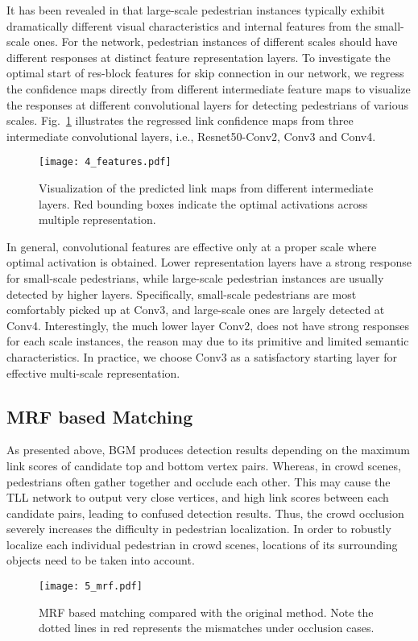 \documentclass[runningheads]{llncs}
\begin{document}
It has been revealed in \cite{SAFRCNN,ADM} that large-scale pedestrian instances typically exhibit dramatically different visual characteristics and internal features from the small-scale ones. For the network, pedestrian instances of different scales should have different responses at distinct feature representation layers. To investigate the optimal start of res-block features for skip connection in our network, we regress the confidence maps directly from different intermediate feature maps to visualize the responses at different convolutional layers for detecting pedestrians of various scales. Fig.~\ref{fig4} illustrates the regressed link confidence maps from three intermediate convolutional layers, i.e., Resnet50-Conv2, Conv3 and Conv4.
\begin{figure}[t]
	\centering
	\texttt{[image: 4\_features.pdf]}
	\caption{Visualization of the predicted link maps from different intermediate layers. Red bounding boxes indicate the optimal activations across multiple representation.}
	\label{fig4}
\end{figure}

In general, convolutional features are effective only at a proper scale where optimal activation is obtained. Lower representation layers have a strong response for small-scale pedestrians, while large-scale pedestrian instances are usually detected by higher layers. Specifically, small-scale pedestrians are most comfortably picked up at Conv3, and large-scale ones are largely detected at Conv4. Interestingly, the much lower layer Conv2, does not have strong responses for each scale instances, the reason may due to its primitive and limited semantic characteristics. In practice, we choose Conv3 as a satisfactory starting layer for effective multi-scale representation.

\subsection{MRF based Matching}

As presented above, BGM produces detection results depending on the maximum link scores of candidate top and bottom vertex pairs. Whereas, in crowd scenes, pedestrians often gather together and occlude each other. This may cause the TLL network to output very close vertices, and high link scores between each candidate pairs, leading to confused detection results. Thus, the crowd occlusion severely increases the difficulty in pedestrian localization. In order to robustly localize each individual pedestrian in crowd scenes, locations of its surrounding objects need to be taken into account.
\begin{figure}[t]
	\centering
	\texttt{[image: 5\_mrf.pdf]}
	\caption{MRF based matching compared with the original method. Note the dotted lines in red represents the mismatches under occlusion cases.}
	\label{fig5}
\end{figure}
\end{document}
